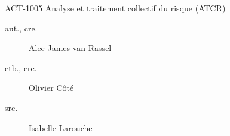 \begin{contrib}{ACT-1005\: Analyse et traitement collectif du risque (ATCR)}
\begin{description}
	\item[aut., cre.] Alec James van Rassel
	\item[ctb., cre.]	Olivier Côté
	\item[src.]	Isabelle Larouche
\end{description}
\end{contrib}